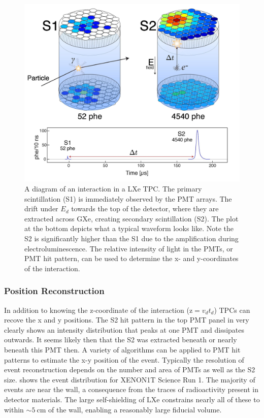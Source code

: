 \begin{figure}
\centering
\includegraphics[width=\textwidth]{LUXTPC}
\caption{A diagram of an interaction in a LXe TPC.  The primary scintillation (S1) is immediately
observed by the PMT arrays.  The \electron drift under $E_{d}$ towards the top of the detector, where they are extracted across GXe,
creating secondary scintillation (S2).  The plot at the bottom depicts what a typical waveform looks like.  Note the S2 is significantly
higher than the S1 due to the amplification during electroluminescence.  The relative intensity of light in the PMTs, or PMT hit
pattern, can be used to determine the x- and y-coordinates of the interaction.}
\label{fig:tpcs_signal_tpc}
\end{figure}



\subsubsection{Position Reconstruction}
\label{subsubsec:tpcs_signals_posrec}
In addition to knowing the z-coordinate of the interaction ($\mathrm{z} = v_{d} t_{d}$) TPCs can recove the x and y positions.  The S2
hit pattern in the top PMT panel in  very clearly shows an intensity distribution that peaks at one
PMT and dissipates outwards.  It seems likely then that the S2 was extracted beneath or nearly beneath this PMT then.  A variety of
algorithms can be applied to PMT hit patterns to estimate the x-y position of the event.  Typically the resolution of event
reconstruction depends on the number and area of PMTs as well as the S2 size.   shows the event
distribution for XENON1T Science Run 1.  The majority of events are near the wall, a consequence from the
traces of radioactivity present in detector materials.  The large self-shielding of LXe constrains nearly all of these to within
$\sim 5\ \mathrm{cm}$ of the wall, enabling a reasonably large fiducial volume.

